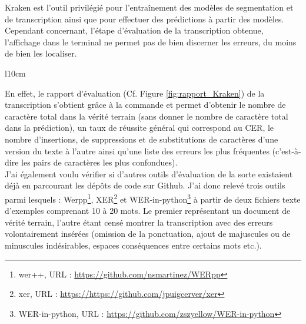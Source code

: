 Kraken est l'outil privilégié pour l'entraînement des modèles de segmentation et de transcription ainsi que pour effectuer des prédictions à partir des modèles. Cependant concernant, l'étape d'évaluation de la transcription obtenue, l'affichage dans le terminal ne permet pas de bien discerner les erreurs, du moins de bien les localiser.

\begin{wrapfigure}[18]{l}{10cm}
    \centering
    \centerline{}
    \caption{Exemple de rapport fourni par kraken , \cite{noauthor_kraken_nodate}}
    \label{fig:rapport_Kraken}
\end{wrapfigure} 

En effet, le rapport d'évaluation (Cf. Figure \ref{fig:rapport_Kraken}) de la transcription s'obtient grâce à la commande  et permet d'obtenir le nombre de caractère total dans la vérité terrain (sans donner le nombre de caractère total dans la prédiction), un taux de réussite général qui correspond au CER, le nombre d'insertions, de suppressions et de substitutions de caractères d'une version du texte à l'autre ainsi qu'une liste des erreurs les plus fréquentes (c'est-à-dire les pairs de caractères les plus confondues).\\

J'ai également voulu vérifier si d'autres outils d'évaluation de la sorte existaient déjà en parcourant les dépôts de code sur Github. J'ai donc relevé trois outils parmi lesquels :  Werpp\footnote{wer++, URL : \url{https://github.com/nsmartinez/WERpp}}, XER\footnote{xer, URL : \url{https://https://github.com/jpuigcerver/xer}} et WER-in-python\footnote{WER-in-python, URL : \url{https://github.com/zszyellow/WER-in-python}} à partir de deux fichiers texte d'exemples comprenant 10 à 20 mots. Le premier représentant un document de vérité terrain, l'autre étant censé montrer la transcription avec des erreurs volontairement insérées (omission de la ponctuation, ajout de majuscules ou de minuscules indésirables, espaces conséquences entre certains mots etc.).\\

